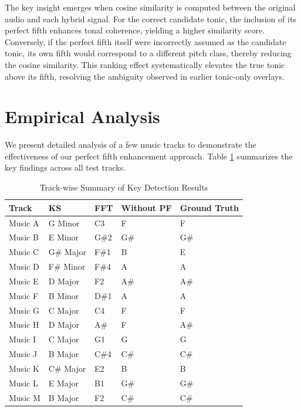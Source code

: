 \documentclass[10pt,twocolumn]{article}
\begin{document}
The key insight emerges when cosine similarity is computed between the original audio and each hybrid signal. For the correct candidate tonic, the inclusion of its perfect fifth enhances tonal coherence, yielding a higher similarity score. Conversely, if the perfect fifth itself were incorrectly assumed as the candidate tonic, its own fifth would correspond to a different pitch class, thereby reducing the cosine similarity. This ranking effect systematically elevates the true tonic above its fifth, resolving the ambiguity observed in earlier tonic-only overlays.

\section{Empirical Analysis}\label{sec:empirical-analysis}

We present detailed analysis of a few music tracks to demonstrate the effectiveness of our perfect fifth enhancement approach.
Table \ref{tab:results-summary} summarizes the key findings across all test tracks.

\begin{table}[H]
\centering
\renewcommand{\arraystretch}{1.2}
\begin{tabular}{@{}lllll@{}}
\toprule
\textbf{Track} & \textbf{KS} & \textbf{FFT} & \textbf{Without PF} & \textbf{Ground Truth}  \\
\midrule
Music A & G Minor & C3 & F & F \\
\rowcolor{lightgray} Music B & E Minor & G\#2 & G\#  & G\# \\
\rowcolor{blue!10} Music C & G\# Major & F\#1 & B  & E \\
Music D & F\# Minor & F\#4 & A & A \\
Music E & D Major & F2 & A\# & A\# \\
Music F & B Minor & D\#1 & A & A \\
\rowcolor{blue!10} Music G & C Major & C4 & F & F \\
\rowcolor{blue!10} Music H & D Major & A\# & F & A\# \\
\rowcolor{lightgray} Music I & C Major & G1 & G & G \\
\rowcolor{lightgray} Music J & B Major & C\#4 & C\# & C\# \\
Music K & C\# Major & E2 & B & B \\
Music L & E Major & B1 & G\# & G\# \\
Music M & B Major & F2 & C\# & C\# \\
\bottomrule
\end{tabular}
\caption{Track-wise Summary of Key Detection Results}
\label{tab:results-summary}
\end{table}
\end{document}
